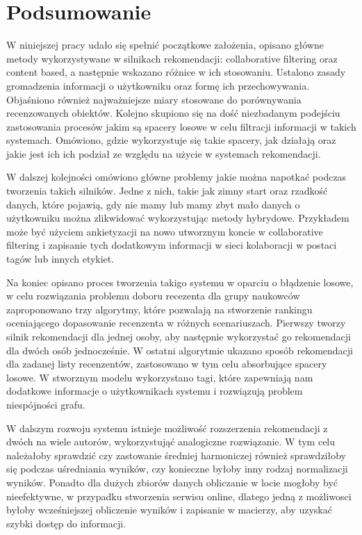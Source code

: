 \chapter{Podsumowanie}
\thispagestyle{chapterBeginStyle}



W niniejszej pracy udało się spełnić początkowe założenia, opisano główne metody wykorzystywane w silnikach rekomendacji: collaborative filtering oraz content based, a następnie wskazano różnice w ich stosowaniu. Ustalono zasady gromadzenia informacji o użytkowniku oraz formę ich przechowywania. Objaśniono również najważniejsze miary stosowane do porównywania recenzowanych obiektów. Kolejno skupiono się na dość niezbadanym podejściu zastosowania procesów jakim są spacery losowe w celu filtracji informacji w takich systemach. Omówiono, gdzie wykorzystuje się takie spacery, jak działają oraz jakie jest ich ich podział ze względu na użycie w systemach rekomendacji.

W dalszej kolejności omówiono główne problemy jakie można napotkać podczas tworzenia takich silników. Jedne z nich, takie jak zimny start oraz rzadkość danych, które pojawią, gdy nie mamy lub mamy zbyt mało danych o użytkowniku można zlikwidować wykorzystując metody hybrydowe. Przykładem może być użyciem ankietyzacji na nowo utworznym koncie w collaborative filtering i zapisanie tych dodatkowym informacji w sieci kolaboracji w postaci tagów lub innych etykiet.

Na koniec opisano proces tworzenia takigo systemu w oparciu o błądzenie losowe, w celu rozwiązania problemu doboru recezenta dla grupy naukowców zaproponowano trzy algorytmy, które pozwalają na stworzenie rankingu oceniającego dopasowanie recenzenta w różnych scenariuszach. Pierwszy tworzy silnik rekomendacji dla jednej osoby, aby następnie wykorzystać go rekomendacji dla dwóch osób jednocześnie. W ostatni algorytmie ukazano sposób rekomendacji dla zadanej listy recenzentów, zastosowano w tym celu absorbujące spacery losowe. W stworznym modelu wykorzystano tagi, które zapewniają nam dodatkowe informacje o użytkownikach systemu i rozwiązują problem niespójności grafu.

W dalszym rozwoju systemu istnieje możliwość rozszerzenia rekomendacji z dwóch na wiele autorów, wykorzystująć analogiczne rozwiązanie. W tym celu należałoby sprawdzić czy zastowanie średniej harmoniczej również sprawdziłoby się podczas uśredniania wyników, czy konieczne byłoby inny rodzaj normalizacji wyników. Ponadto dla dużych zbiorów danych obliczanie w locie mogłoby być nieefektywne, w przypadku stworzenia serwisu online, dlatego jedną z możliwosci byłoby wcześniejszej obliczenie wyników i zapisanie w macierzy, aby uzyskać szybki dostęp do informacji.